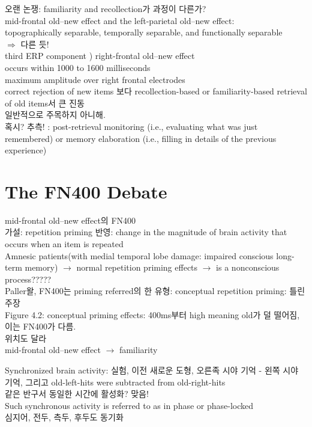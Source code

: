 \documentclass[../note.tex]{subfiles}
\begin{document}
오랜 논쟁: familiarity and recollection가 과정이 다른가?\\
mid-frontal old–new effect and the left-parietal old–new effect:\\
topographically separable, temporally separable, and functionally separable\\
$\Longrightarrow$ 다른 듯!\\

third ERP component ) right-frontal old–new effect\\
occurs within 1000 to 1600 milliseconds\\
maximum amplitude over right frontal electrodes\\
correct rejection of new items 보다 recollection-based or familiarity-based retrieval of old items서 큰 진동\\
일반적으로 주목하지 아니해.\\
혹시? 추측! : post-retrieval
monitoring (i.e., evaluating what was just remembered) or memory
elaboration (i.e., filling in details of the previous experience)\\

\section{The FN400 Debate}
mid-frontal old–new effect의 FN400\\
가설: repetition priming 반영: change in the magnitude of brain activity that occurs when an item is repeated\\
Amnesic patients(with medial temporal lobe damage: impaired conscious long-term memory) $\rightarrow$ normal repetition priming effects
$\rightarrow$ is a nonconscious process?????\\

Paller왈, FN400는 priming referred의 한 유형: conceptual repetition
priming: 틀린 주장\\
Figure 4.2: conceptual priming effects: 400ms부터 high meaning old가 덜 떨어짐, 이는 FN400가 다름.\\
위치도 달라\\
mid-frontal old–new effect $\rightarrow$ familiarity

Synchronized brain activity: 실험, 이전 새로운 도형, 오른족 시야 기억 - 왼쪽 시야 기억, 그리고 old-left-hits were subtracted from old-right-hits\\
같은 반구서 동일한 시간에 활성화? 맞음!\\
Such synchronous activity is referred to
as in phase or phase-locked\\
심지어, 전두, 측두, 후두도 동기화\\
\end{document}
